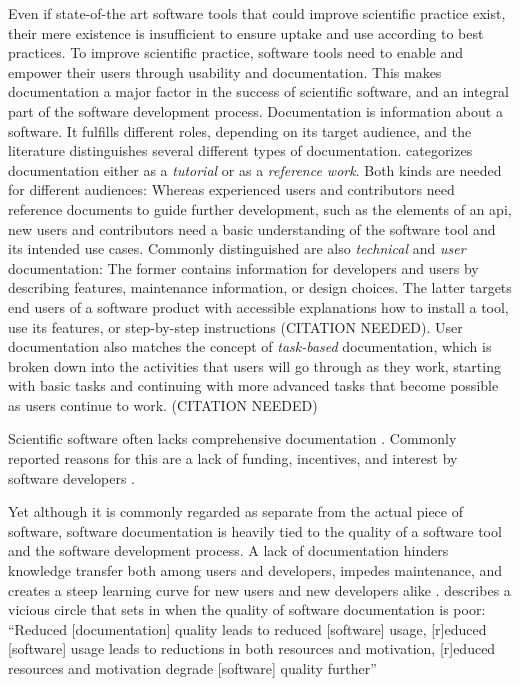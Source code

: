 Even if state-of-the art software tools that could improve scientific practice exist, their mere existence is insufficient to ensure uptake and use according to best practices.
To improve scientific practice, software tools need to enable and empower their users through usability and documentation.
This makes documentation a major factor in the success of scientific software, and an integral part of the software development process.
Documentation is information about a software.
It fulfills different roles, depending on its target audience, and the literature distinguishes several different types of documentation.
\citet{Parnas2011} categorizes documentation either as a \textit{tutorial} or as a \textit{reference work}.
Both kinds are needed for different audiences: Whereas experienced users and contributors need reference documents to guide further development, such as the elements of an \gls{api}, new users and contributors need a basic understanding of the software tool and its intended use cases.
Commonly distinguished are also \textit{technical} and \textit{user} documentation: The former contains information for developers and users by describing features, maintenance information, or design choices.
The latter targets end users of a software product with accessible explanations how to install a tool, use its features, or step-by-step instructions (CITATION NEEDED). %
User documentation also matches the concept of \textit{task-based} documentation, which is broken down into the activities that users will go through as they work, starting with basic tasks and continuing with more advanced tasks that become possible as users continue to work. (CITATION NEEDED) %


Scientific software often lacks comprehensive documentation \citep{segal2007some} \citep{pawlik2012documentation}.
Commonly reported reasons for this are a lack of funding, incentives, and interest by software developers \citep{pawlik2012documentation}.


Yet although it is commonly regarded as separate from the actual piece of software, software documentation is heavily tied to the quality of a software tool and the software development process.
A lack of documentation hinders knowledge transfer both among users and developers, impedes maintenance, and creates a steep learning curve for new users and new developers alike \citep{theunissen}.
\citet{Parnas2011} describes a vicious circle that sets in when the quality of software documentation is poor:
``Reduced [documentation] quality leads to reduced [software] usage, [r]educed [software] usage leads to reductions in both resources and motivation, [r]educed resources and motivation degrade [software] quality further''


